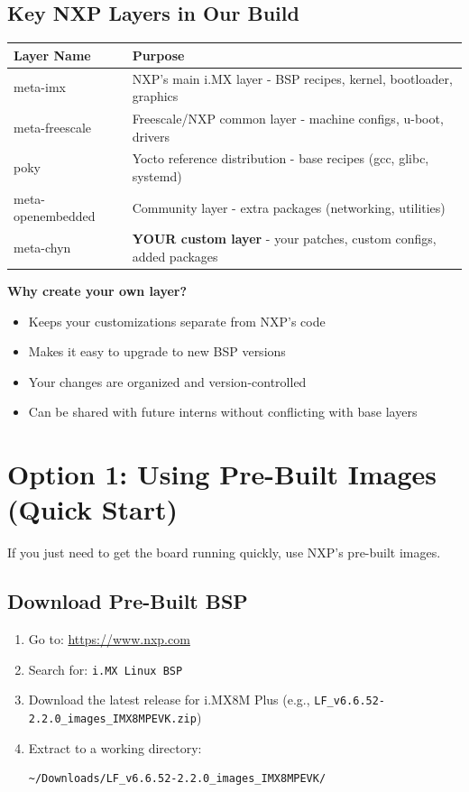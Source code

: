 \documentclass[12pt,a4paper]{report}
\begin{document}
\subsection{Key NXP Layers in Our Build}

\begin{center}
\begin{tabular}{|l|p{8cm}|}
\hline
\textbf{Layer Name} & \textbf{Purpose} \\
\hline
meta-imx & NXP's main i.MX layer - BSP recipes, kernel, bootloader, graphics \\
\hline
meta-freescale & Freescale/NXP common layer - machine configs, u-boot, drivers \\
\hline
poky & Yocto reference distribution - base recipes (gcc, glibc, systemd) \\
\hline
meta-openembedded & Community layer - extra packages (networking, utilities) \\
\hline
meta-chyn & \textbf{YOUR custom layer} - your patches, custom configs, added packages \\
\hline
\end{tabular}
\end{center}

\begin{important}
\textbf{Why create your own layer?}
\begin{itemize}
    \item Keeps your customizations separate from NXP's code
    \item Makes it easy to upgrade to new BSP versions
    \item Your changes are organized and version-controlled
    \item Can be shared with future interns without conflicting with base layers
\end{itemize}
\end{important}

\section{Option 1: Using Pre-Built Images (Quick Start)}

If you just need to get the board running quickly, use NXP's pre-built images.

\subsection{Download Pre-Built BSP}

\begin{enumerate}
    \item Go to: \url{https://www.nxp.com}
    \item Search for: \texttt{i.MX Linux BSP}
    \item Download the latest release for i.MX8M Plus (e.g., \texttt{LF\_v6.6.52-2.2.0\_images\_IMX8MPEVK.zip})
    \item Extract to a working directory:
    \begin{lstlisting}[language=bash]
~/Downloads/LF_v6.6.52-2.2.0_images_IMX8MPEVK/
    \end{lstlisting}
\end{enumerate}
\end{document}

